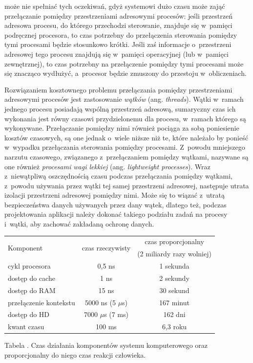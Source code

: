 \documentclass[12pt,makeidx]{mwart}
\newcounter{tabmain}
\newcommand{\mytabcaption}[1]{ \begin{center}Tabela \arabic{tabmain}. #1.\end{center} \addtocounter{tabmain}{1} }
\begin{document}
	może nie spełniać tych oczekiwań, gdyż systemowi dużo czasu może zająć przełączanie pomiędzy przestrzeniami adresowymi procesów:
	jeśli przestrzeń adresowa procesu, do którego przechodzi sterowanie, znajduje się w~pamięci podręcznej procesora, to czas potrzebny do 
	przełączenia sterowania pomiędzy tymi procesami będzie stosunkowo krótki. Jeśli zaś informacje o~przestrzeni adresowej tego procesu znajdują się
	w~pamięci operacyjnej (lub w~pamięci zewnętrznej), to czas potrzebny na przełączenie pomiędzy tymi procesami może się znacząco wydłużyć,
	a~procesor będzie zmuszony do przestoju w~obliczeniach.
\par
%
\indent
	Rozwiązaniem kosztownego problemu przełączania pomiędzy przestrzeniami adresowymi procesów jest zastosowanie \emph{wątków} (ang. \emph{threads}).
	Wątki w~ramach jednego procesu posiadają wspólną przestrzeń adresową, sumaryczny czas ich wykonania jest równy czasowi przydzielonemu dla 
	procesu, w~ramach którego są wykonywane. Przełączanie pomiędzy nimi również pociąga za sobą poniesienie kosztów czasowych, są one jednak
	o~wiele niższe niż te, które należało by ponieść w~wypadku przełączania sterowania pomiędzy procesami. Z~powodu mniejszego narzutu czasowego,
	związanego z~przełączaniem pomiędzy wątkami, nazywane są one również \emph{procesami wagi lekkiej} (ang. \emph{lightweight processes}).
	Wraz z~niewątpliwą oszczędnością czasu podczas przełączania pomiędzy wątkami, z~powodu używania przez wątki tej samej przestrzeni adresowej,
	następuje utrata izolacji przestrzeni adresowej pomiędzy nimi. Może się to wiązać z~utratą bezpieczeństwa danych używanych przez dany wątek,
	dlatego też, podczas projektowania aplikacji należy dokonać takiego podziału zadań na procesy i~wątki, aby zachować zakładaną ochronę danych.
\par
%
\indent
	\begin{center}
	\centering
	\begin{tabular}{|l|c|c|} \hline
		\multirow{2}{*}{Komponent} & \multirow{2}{*}{czas rzeczywisty}	& czas proporcjonalny \\ 
					  &                   & (2 miliardy razy wolniej) \\ \hline
		cykl procesora	& 0,5 ns & 1 sekunda \\\hline
		dostęp do cache & 1 ns & 2 sekundy \\\hline
		dostęp do RAM	  & 15 ns & 30 sekund \\\hline
		przełączenie kontekstu & 5000 ns (5 $\mu$s) & 167 minut \\\hline
		dostęp do HD		& 7000 $\mu$s (7 ms) & 162 dni \\\hline
		kwant czasu 		& 100 ms	& 6,3 roku \\\hline
	\end{tabular}
		\mytabcaption{Czas działania komponentów systemu komputerowego oraz proporcjonalny do niego czas reakcji człowieka}
	\label{tab:timecomp}
	\end{center}
\end{document}
